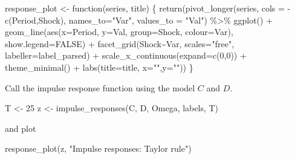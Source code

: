 \documentclass[
  letterpaper,
]{book}
\newenvironment{Shaded}{\begin{snugshade}}{\end{snugshade}}
\newcommand{\AttributeTok}[1]{\textcolor[rgb]{0.40,0.45,0.13}{#1}}
\newcommand{\ConstantTok}[1]{\textcolor[rgb]{0.56,0.35,0.01}{#1}}
\newcommand{\ControlFlowTok}[1]{\textcolor[rgb]{0.00,0.23,0.31}{#1}}
\newcommand{\DecValTok}[1]{\textcolor[rgb]{0.68,0.00,0.00}{#1}}
\newcommand{\FunctionTok}[1]{\textcolor[rgb]{0.28,0.35,0.67}{#1}}
\newcommand{\NormalTok}[1]{\textcolor[rgb]{0.00,0.23,0.31}{#1}}
\newcommand{\OtherTok}[1]{\textcolor[rgb]{0.00,0.23,0.31}{#1}}
\newcommand{\SpecialCharTok}[1]{\textcolor[rgb]{0.37,0.37,0.37}{#1}}
\newcommand{\StringTok}[1]{\textcolor[rgb]{0.13,0.47,0.30}{#1}}
\begin{document}
\begin{Shaded}
\begin{Highlighting}[]
\NormalTok{response\_plot }\OtherTok{\textless{}{-}} \ControlFlowTok{function}\NormalTok{(series, title) \{}
  \FunctionTok{return}\NormalTok{(}\FunctionTok{pivot\_longer}\NormalTok{(series, }\AttributeTok{cols =} \SpecialCharTok{{-}}\FunctionTok{c}\NormalTok{(Period,Shock), }\AttributeTok{names\_to=}\StringTok{"Var"}\NormalTok{, }\AttributeTok{values\_to =} \StringTok{"Val"}\NormalTok{) }\SpecialCharTok{\%\textgreater{}\%}
           \FunctionTok{ggplot}\NormalTok{() }\SpecialCharTok{+}
           \FunctionTok{geom\_line}\NormalTok{(}\FunctionTok{aes}\NormalTok{(}\AttributeTok{x=}\NormalTok{Period, }\AttributeTok{y=}\NormalTok{Val, }\AttributeTok{group=}\NormalTok{Shock, }\AttributeTok{colour=}\NormalTok{Var), }\AttributeTok{show.legend=}\ConstantTok{FALSE}\NormalTok{) }\SpecialCharTok{+}
           \FunctionTok{facet\_grid}\NormalTok{(Shock}\SpecialCharTok{\textasciitilde{}}\NormalTok{Var, }\AttributeTok{scales=}\StringTok{"free"}\NormalTok{, }\AttributeTok{labeller=}\NormalTok{label\_parsed) }\SpecialCharTok{+}
           \FunctionTok{scale\_x\_continuous}\NormalTok{(}\AttributeTok{expand=}\FunctionTok{c}\NormalTok{(}\DecValTok{0}\NormalTok{,}\DecValTok{0}\NormalTok{)) }\SpecialCharTok{+}
           \FunctionTok{theme\_minimal}\NormalTok{() }\SpecialCharTok{+}
           \FunctionTok{labs}\NormalTok{(}\AttributeTok{title=}\NormalTok{title, }\AttributeTok{x=}\StringTok{""}\NormalTok{,}\AttributeTok{y=}\StringTok{""}\NormalTok{))}
\NormalTok{\}}
\end{Highlighting}
\end{Shaded}

Call the impulse response function using the model \(C\) and \(D\).

\begin{Shaded}
\begin{Highlighting}[]
\NormalTok{T }\OtherTok{\textless{}{-}} \DecValTok{25}
\NormalTok{z }\OtherTok{\textless{}{-}} \FunctionTok{impulse\_responses}\NormalTok{(C, D, Omega, labels, T)}
\end{Highlighting}
\end{Shaded}

and plot

\begin{Shaded}
\begin{Highlighting}[]
\FunctionTok{response\_plot}\NormalTok{(z, }\StringTok{"Impulse responses: Taylor rule"}\NormalTok{)}
\end{Highlighting}
\end{Shaded}
\end{document}
